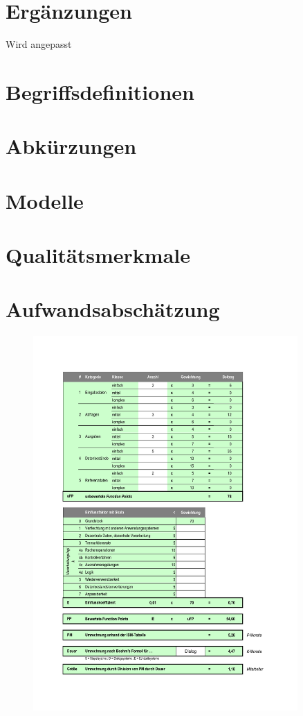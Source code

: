 	
	\section{Ergänzungen}
	Wird angepasst	
	
	
 \begin{appendix}
  \section{Begriffsdefinitionen}
  \section{Abkürzungen}
  \section{Modelle}
  \section{Qualitätsmerkmale}
  \clearpage
  \section{Aufwandsabschätzung}
  
  	\begin{figure}[ht]
	\centering
	\includegraphics[width=0.9\textwidth]{./files/Aufwand}
	\label{fig:Aufwand}
	\end{figure}

  \end{appendix}

			  
